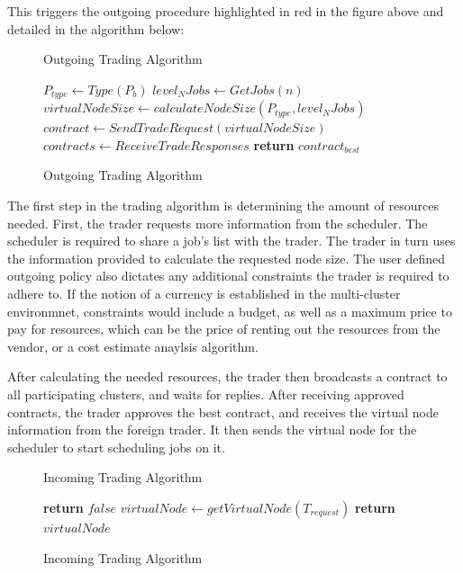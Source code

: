This triggers the outgoing procedure highlighted in red in the figure above and
detailed in the algorithm below:

\begin{figure}[H]
\begin{algorithm}[H]
\caption{Outgoing Trading Algorithm}
\begin{algorithmic}
   
    \State $P_{type} \gets Type(P_b)$
    \State $level_N Jobs \gets GetJobs(n)$ 
    \State $virtualNodeSize \gets calculateNodeSize(P_{type}, level_N Jobs)$
      \State $contract \gets SendTradeRequest(virtualNodeSize)$
    \EndFor
    \State $contracts \gets ReceiveTradeResponses$ 
    \State \textbf{return} $contract_{best}$
    
  \EndProcedure
\end{algorithmic}
\end{algorithm}
\caption{Outgoing Trading Algorithm}
\end{figure}

The first step in the trading algorithm is determining the amount of resources
needed. First, the trader requests more information from the scheduler. The
scheduler is required to share a job's list with the trader. The trader in turn
uses the information provided to calculate the requested node size. The user
defined outgoing policy also dictates any additional constraints the trader is
required to adhere to. If the notion of a currency is established in the
multi-cluster environmnet, constraints would include a budget, as well as a
maximum price to pay for resources, which can be the price of renting out the
resources from the vendor, or a cost estimate anaylsis algorithm. 

After calculating the needed resources, the trader then broadcasts a contract
to all participating clusters, and waits for replies. After receiving approved
contracts, the trader approves the best contract, and receives the virtual node
information from the foreign trader. It then sends the virtual node for the
scheduler to start scheduling jobs on it.

\begin{figure}[H]
\begin{algorithm}[H]
\caption{Incoming Trading Algorithm}
\begin{algorithmic}
   
       
      \State \textbf{return} $false$ 
      \EndIf
    \EndFor
    \State $virtualNode \gets getVirtualNode(T_{request})$     
    \State \textbf{return} $virtualNode$ 
  \EndProcedure
\end{algorithmic}
\end{algorithm}
\caption{Incoming Trading Algorithm}
\end{figure}

